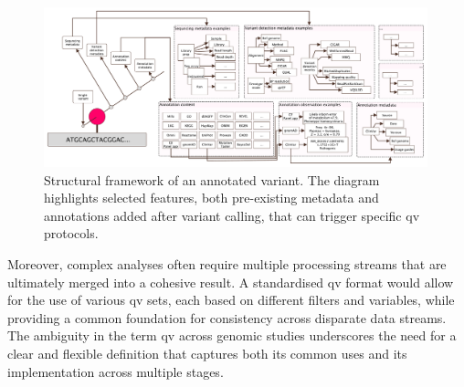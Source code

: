 \begin{figure}[h!]
\centering
     \includegraphics[width=0.99\textwidth]{./images/qv_structure_vcurrent.pdf}
\caption{
Structural framework of an annotated variant. The diagram highlights selected features, both pre-existing metadata and annotations added after variant calling, that can trigger specific \ac{qv} protocols.
}
\label{fig:qv_structure_vcurrent}
\end{figure}


Moreover, complex analyses often require multiple processing streams that are ultimately merged into a cohesive result. A standardised \ac{qv} format would allow for the use of various \ac{qv} sets, each based on different filters and variables, while providing a common foundation for consistency across disparate data streams. The ambiguity in the term \ac{qv} across genomic studies underscores the need for a clear and flexible definition that captures both its common uses and its implementation across multiple stages.


